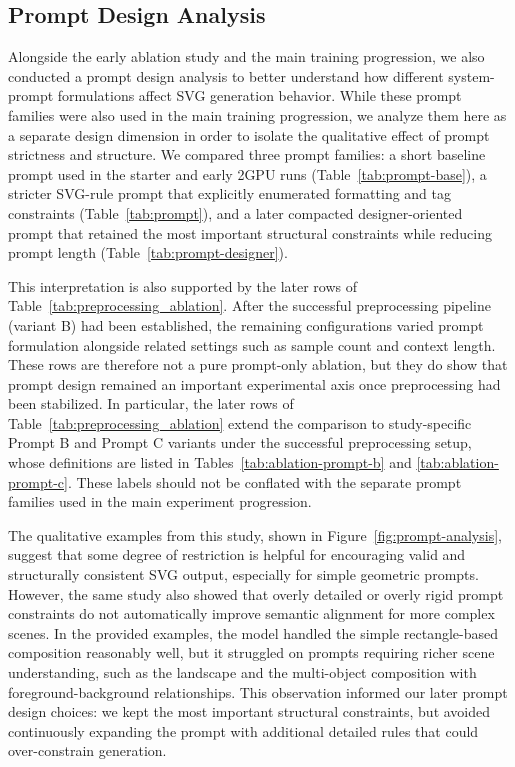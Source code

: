 \documentclass[11pt]{article}
\begin{document}
\subsection{Prompt Design Analysis}

Alongside the early ablation study and the main training progression, we also
conducted a prompt design analysis to better understand how different
system-prompt formulations affect SVG generation behavior. While these prompt
families were also used in the main training progression, we analyze them here
as a separate design dimension in order to isolate the qualitative effect of
prompt strictness and structure. We compared three prompt families: a short
baseline prompt used in the starter and early 2GPU runs
(Table~\ref{tab:prompt-base}), a stricter SVG-rule prompt that explicitly
enumerated formatting and tag constraints (Table~\ref{tab:prompt}), and a
later compacted designer-oriented prompt that retained the most important
structural constraints while reducing prompt length
(Table~\ref{tab:prompt-designer}).

This interpretation is also supported by the later rows of
Table~\ref{tab:preprocessing_ablation}. After the successful preprocessing
pipeline (variant B) had been established, the remaining configurations varied
prompt formulation alongside related settings such as sample count and context
length. These rows are therefore not a pure prompt-only ablation, but they do
show that prompt design remained an important experimental axis once
preprocessing had been stabilized. In particular, the later rows of
Table~\ref{tab:preprocessing_ablation} extend the comparison to study-specific
Prompt B and Prompt C variants under the successful preprocessing setup, whose
definitions are listed in Tables~\ref{tab:ablation-prompt-b} and
\ref{tab:ablation-prompt-c}. These labels should not be conflated with the
separate prompt families used in the main experiment progression.

The qualitative examples from this study, shown in
Figure~\ref{fig:prompt-analysis}, suggest that some degree of restriction is
helpful for encouraging valid and structurally consistent SVG output,
especially for simple geometric prompts. However, the same study also showed
that overly detailed or overly rigid prompt constraints do not automatically
improve semantic alignment for more complex scenes. In the provided examples,
the model handled the simple rectangle-based composition reasonably well, but
it struggled on prompts requiring richer scene understanding, such as the
landscape and the multi-object composition with foreground-background
relationships. This observation informed our later prompt design choices: we
kept the most important structural constraints, but avoided continuously
expanding the prompt with additional detailed rules that could over-constrain
generation.
\end{document}
